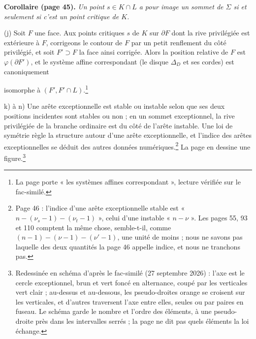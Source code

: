 \documentclass[11pt,a4paper]{article}
\begin{document}
\textbf{Corollaire (page 45).} \emph{Un point $s \in K \cap L$ a pour image un
sommet de $\Sigma$ si et seulement si c'est un \emph{point critique} de $K$.}

(j) Soit $F$ une face. Aux points critiques $s$ de $K$ sur $\partial F$ dont la
rive privilégiée est extérieure à $F$, corrigeons le contour de $F$ par un petit
renflement du côté privilégié, et soit $F' \supset F$ la face ainsi corrigée.
Alors la position relative de $F$ est $\varphi(\partial F')$, et le système
affine correspondant (le disque $\Delta_D$ et ses cordes) est canoniquement

isomorphe à $(F', F' \cap L)$.\footnote{La page porte « les systèmes affines
correspondant », lecture vérifiée sur le fac-similé.}

k) à n) Une arête exceptionnelle est stable ou instable selon que ses deux
positions incidentes sont stables ou non ; en un sommet exceptionnel, la rive
privilégiée de la branche ordinaire est du côté de l'arête instable. Une loi de
symétrie règle la structure autour d'une arête exceptionnelle, et l'indice des
arêtes exceptionnelles se déduit des autres données numériques.\footnote{Page
46 : l'indice d'une arête exceptionnelle stable est « $n - (\nu_{s} - 1) -
(\nu_t - 1)$ », celui d'une instable « $n - \nu$ ». Les pages 55, 93 et 110
comptent la même chose, semble-t-il, comme $(n - 1) - (\nu - 1) - (\nu' - 1)$,
une unité de moins ; nous ne savons pas laquelle des deux quantités la page 46
appelle indice, et nous ne tranchons pas.} La page en dessine une figure.\footnote{Redessinée en schéma d'après le fac-similé (27 septembre
2026) : l'axe est le cercle exceptionnel, brun et vert foncé en alternance,
coupé par les verticales vert clair ; au-dessus et au-dessous, les pseudo-droites
orange se croisent sur les verticales, et d'autres traversent l'axe entre elles,
seules ou par paires en fuseau. Le schéma garde le nombre et l'ordre des
éléments, à une pseudo-droite près dans les intervalles serrés ; la page ne dit
pas quels éléments la loi échange.}
\end{document}
